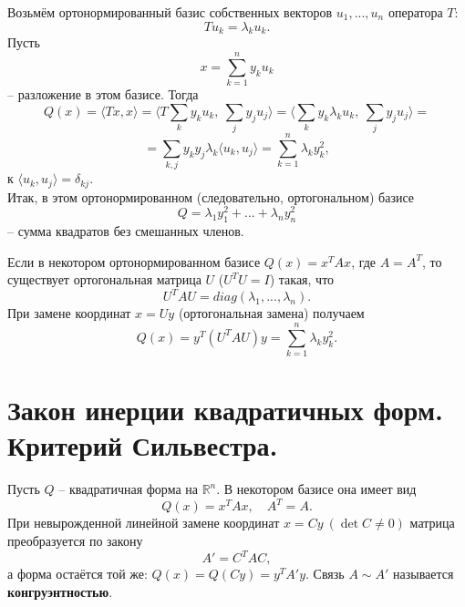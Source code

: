 \documentclass[14pt]{extreport}
\begin{document}
    \begin{thbox}
        Возьмём ортонормированный базис собственных векторов $u_1,...,u_n$ оператора $T$:
        \[
        Tu_k = \lambda_ku_k.
        \]
        Пусть
        \[
        x = \sum_{k=1}^n y_ku_k
        \]
        – разложение в этом базисе. Тогда
        \[
        Q(x) = \langle Tx,x \rangle = \Bigg\langle T\sum_k y_ku_k,\ \sum_j y_ju_j \Bigg\rangle = \Bigg\langle \sum_k y_k\lambda_ku_k,\ \sum_j y_ju_j \Bigg\rangle =
        \]
        \[
        = \sum_{k,j} y_ky_j\lambda_k \langle u_k,u_j \rangle = \sum_{k=1}^n \lambda_ky_k^2,
        \]
        к $\langle u_k,u_j \rangle = \delta_{kj}$.\\
        Итак, в этом ортонормированном (следовательно, ортогональном) базисе
        \[
        Q = \lambda_1y_1^2 + ... + \lambda_ny_n^2
        \]
        – сумма квадратов без смешанных членов.
    \end{thbox}

    \begin{impbox}
        Если в некотором ортонормированном базисе $Q(x) = x^TAx$, где $A = A^T$, то существует ортогональная матрица $U$ ($U^TU = I$) такая, что
        \[
        U^TAU = diag(\lambda_1,...,\lambda_n).
        \]
        При замене координат $x = Uy$ (ортогональная замена) получаем
        \[
        Q(x) = y^T (U^TAU) y = \sum_{k=1}^n \lambda_ky_k^2.
        \]
    \end{impbox}



    \chapter{Закон инерции квадратичных форм. Критерий Сильвестра.}

    \begin{defbox}
        Пусть $Q$ – квадратичная форма на $\mathbb{R}^n$. В некотором базисе она имеет вид
        \[
        Q(x) = x^TAx, \quad A^T=A.
        \]
        При невырожденной линейной замене координат $x = Cy\ (\det C \neq 0)$ матрица преобразуется по закону
        \[
        A' = C^TAC,
        \]
        а форма остаётся той же: $Q(x) = Q(Cy) = y^TA'y$. Связь $A \sim A'$ называется \textbf{конгруэнтностью}.
    \end{defbox}
\end{document}
